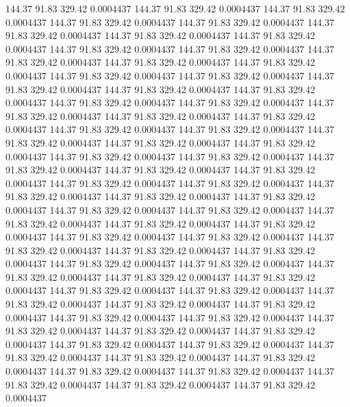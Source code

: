  144.37   91.83  329.42   0.0004437
 144.37   91.83  329.42   0.0004437
 144.37   91.83  329.42   0.0004437
 144.37   91.83  329.42   0.0004437
 144.37   91.83  329.42   0.0004437
 144.37   91.83  329.42   0.0004437
 144.37   91.83  329.42   0.0004437
 144.37   91.83  329.42   0.0004437
 144.37   91.83  329.42   0.0004437
 144.37   91.83  329.42   0.0004437
 144.37   91.83  329.42   0.0004437
 144.37   91.83  329.42   0.0004437
 144.37   91.83  329.42   0.0004437
 144.37   91.83  329.42   0.0004437
 144.37   91.83  329.42   0.0004437
 144.37   91.83  329.42   0.0004437
 144.37   91.83  329.42   0.0004437
 144.37   91.83  329.42   0.0004437
 144.37   91.83  329.42   0.0004437
 144.37   91.83  329.42   0.0004437
 144.37   91.83  329.42   0.0004437
 144.37   91.83  329.42   0.0004437
 144.37   91.83  329.42   0.0004437
 144.37   91.83  329.42   0.0004437
 144.37   91.83  329.42   0.0004437
 144.37   91.83  329.42   0.0004437
 144.37   91.83  329.42   0.0004437
 144.37   91.83  329.42   0.0004437
 144.37   91.83  329.42   0.0004437
 144.37   91.83  329.42   0.0004437
 144.37   91.83  329.42   0.0004437
 144.37   91.83  329.42   0.0004437
 144.37   91.83  329.42   0.0004437
 144.37   91.83  329.42   0.0004437
 144.37   91.83  329.42   0.0004437
 144.37   91.83  329.42   0.0004437
 144.37   91.83  329.42   0.0004437
 144.37   91.83  329.42   0.0004437
 144.37   91.83  329.42   0.0004437
 144.37   91.83  329.42   0.0004437
 144.37   91.83  329.42   0.0004437
 144.37   91.83  329.42   0.0004437
 144.37   91.83  329.42   0.0004437
 144.37   91.83  329.42   0.0004437
 144.37   91.83  329.42   0.0004437
 144.37   91.83  329.42   0.0004437
 144.37   91.83  329.42   0.0004437
 144.37   91.83  329.42   0.0004437
 144.37   91.83  329.42   0.0004437
 144.37   91.83  329.42   0.0004437
 144.37   91.83  329.42   0.0004437
 144.37   91.83  329.42   0.0004437
 144.37   91.83  329.42   0.0004437
 144.37   91.83  329.42   0.0004437
 144.37   91.83  329.42   0.0004437
 144.37   91.83  329.42   0.0004437
 144.37   91.83  329.42   0.0004437
 144.37   91.83  329.42   0.0004437
 144.37   91.83  329.42   0.0004437
 144.37   91.83  329.42   0.0004437
 144.37   91.83  329.42   0.0004437
 144.37   91.83  329.42   0.0004437
 144.37   91.83  329.42   0.0004437
 144.37   91.83  329.42   0.0004437
 144.37   91.83  329.42   0.0004437
 144.37   91.83  329.42   0.0004437
 144.37   91.83  329.42   0.0004437
 144.37   91.83  329.42   0.0004437
 144.37   91.83  329.42   0.0004437
 144.37   91.83  329.42   0.0004437
 144.37   91.83  329.42   0.0004437
 144.37   91.83  329.42   0.0004437
 144.37   91.83  329.42   0.0004437
